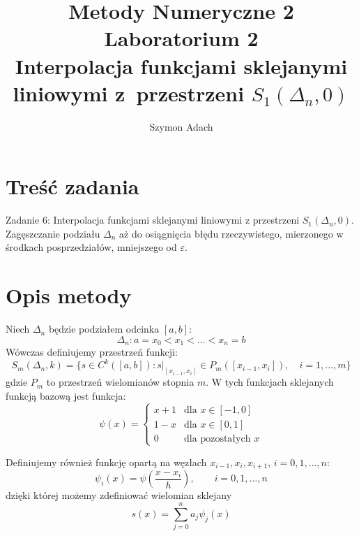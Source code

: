 \documentclass[]{article}
\title{\textbf{ Metody Numeryczne 2\\Laboratorium 2\\}
Interpolacja funkcjami sklejanymi liniowymi z~przestrzeni $S_1(\Delta_n, 0)$}
\author{Szymon Adach}
\begin{document}
\maketitle


\section{Treść zadania}

Zadanie 6: Interpolacja funkcjami sklejanymi liniowymi z przestrzeni $S_1(\Delta_n, 0)$. Zagęszczanie podziału $\Delta_n$ aż do osiągnięcia błędu rzeczywistego, mierzonego w środkach posprzedziałów, mniejszego od $\varepsilon$.	
\section{Opis metody}
Niech $\Delta_n$ będzie podziałem odcinka $[a,b]$:
\[ \Delta_n : a = x_0 < x_1 < \dots < x_n = b \]
Wówczas definiujemy przestrzeń funkcji:
\[ S_m(\Delta_n, k) = \{ s \in C^k([a,b]) : s |_{[x_{i-1}, x_i]} \in P_m([x_{i-1},x_i]), \quad i = 1,\dots,m \} \]
gdzie $P_m$ to przestrzeń wielomianów stopnia $m$. 
W tych funkcjach sklejanych funkcją bazową jest funkcja:
\[ \psi(x) = \begin{cases}
x + 1 & \text{dla } x \in [-1, 0] \\
1 - x & \text{dla } x \in [0, 1] \\
0 & \text{dla pozostałych } x
\end{cases} \]

Definiujemy również funkcję opartą na węzłach $x_{i-1}, x_i, x_{i+1}$, $i = 0,1,\dots,n$:
\[ \psi_i(x) = \psi \left( \frac{x-x_i}{h} \right), \qquad i = 0,1,\dots,n \]
dzięki której możemy zdefiniować wielomian sklejany
\[ s(x) = \sum_{j=0}^n a_j \psi_j(x) \]
\end{document}
